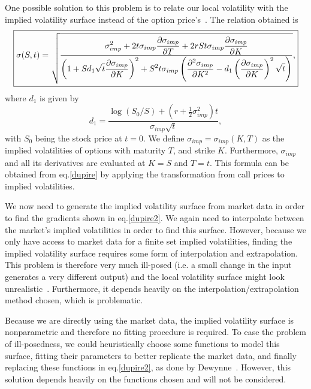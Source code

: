 One possible solution to this problem is to relate our local volatility with the implied volatility surface instead of the option price's~\cite{Wilmott2}.
The relation obtained is
\begin{equation}\label{dupire2}
\boxed{\sigma(S,t)=\sqrt{\frac{\displaystyle\sigma_{imp}^2+2t\sigma_{imp}\pdv{\sigma_{imp}}{T}+2rSt\sigma_{imp}\pdv{\sigma_{imp}}{K}}{\displaystyle\left(1+Sd_1\sqrt{t}\pdv{\sigma_{imp}}{K}\right)^2+S^2t\sigma_{imp}\left(\pdv{^2\sigma_{imp}}{K^2}-d_1\left(\pdv{\sigma_{imp}}{K}\right)^2\sqrt{t}\right)}},}
\end{equation}
\noindent where $d_1$ is given by
\begin{equation}
d_1=\frac{\log(S_0/S)+\left(r+\frac{1}{2}\sigma_{imp}^2\right)t}{\sigma_{imp}\sqrt{t}},
\end{equation}
\noindent with $S_0$ being the stock price at $t=0$. We define $\sigma_{imp}=\sigma_{imp}(K,T)$ as the implied volatilities of options with maturity $T$, and strike $K$. Furthermore, $\sigma_{imp}$ and all its derivatives are evaluated at $K=S$ and $T=t$. This formula can be obtained from eq.\eqref{dupire} by applying the transformation from call prices to implied volatilities.


We now need to generate the implied volatility surface from market data in order to find the gradients shown in eq.\eqref{dupire2}. We again need to interpolate between the market's implied volatilities in order to find this surface.
However, because we only have access to market data for a finite set implied volatilities, finding the implied volatility surface requires some form of interpolation and extrapolation. This problem is therefore very much ill-posed (i.e. a small change in the input generates a very different output) and the local volatility surface might look unrealistic~\cite{Wilmott}. Furthermore, it depends heavily on the interpolation/extrapolation method chosen, which is problematic.

Because we are directly using the market data, the implied volatility surface is nonparametric and therefore no fitting procedure is required. To ease the problem of ill-posedness, we could heuristically choose some functions to model this surface, fitting their parameters to better replicate the market data, and finally replacing these functions in eq.\eqref{dupire2}, as done by Dewynne~\cite{dewynne}. However, this solution depends heavily on the functions chosen and will not be considered.



